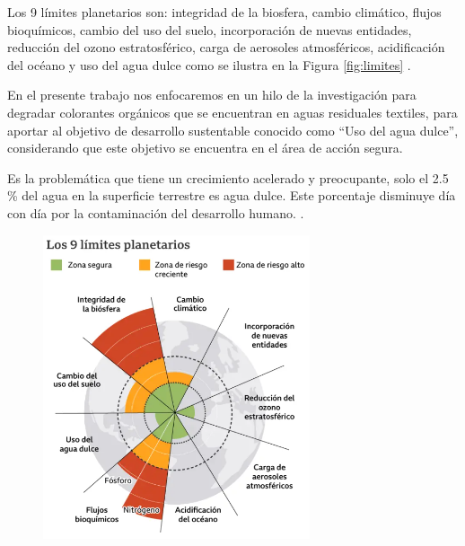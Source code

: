 \documentclass[12pt]{article}
\begin{document}
Los 9 límites planetarios son: integridad de la biosfera, cambio climático, flujos bioquímicos, cambio del uso del suelo, incorporación de nuevas entidades, reducción del ozono estratosférico, carga de aerosoles atmosféricos, acidificación del océano y uso del agua dulce como se ilustra en la Figura \ref{fig:limites} \cite{IEEEreferencias:Ref2}.
\vspace{1em} %

En el presente trabajo nos enfocaremos en un hilo de la investigación para degradar colorantes orgánicos que se encuentran en aguas residuales textiles, para aportar al objetivo de desarrollo sustentable conocido como “Uso del agua dulce”, considerando que este objetivo se encuentra en el área de acción segura.

Es la problemática que tiene un crecimiento acelerado y preocupante, solo el 2.5 \% del agua en la superficie terrestre es agua dulce. Este porcentaje disminuye día con día por la contaminación del desarrollo humano. \cite{IEEEreferencias:Ref3}.
\vspace{1em} %



     \begin{figure}[H]
    	   \begin{center}
     	  	\includegraphics[width = 0.7\textwidth]{Imagenes/limitesplanetarios.png}
    	   \end{center} 
        \end{figure}
\end{document}
